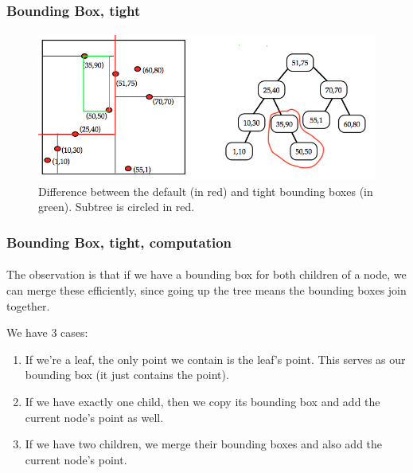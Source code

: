 \documentclass{beamer}                             %
\begin{document}
\begin{frame}
\frametitle{Bounding Box, tight}
\framesubtitle{}
\begin{figure}[h!]
  \centering
  \includegraphics[scale=0.38]{bounding_boxes.png}
  \caption{Difference between the default (in red)
and tight bounding boxes (in green). Subtree is circled in red.}
\end{figure}
\end{frame}

\begin{frame}
\frametitle{Bounding Box, tight, computation}
\framesubtitle{}
The observation is that if we have a bounding box for both
children of a node, we can merge these efficiently, since
going up the tree means the bounding boxes join together.

We have 3 cases:
\begin{enumerate}
  \item If we're a leaf, the only point we contain is the leaf's point.
    This serves as our bounding box (it just contains the point).
  \item If we have exactly one child, then we copy its bounding box and add
    the current node's point as well.
  \item If we have two children, we merge their bounding boxes and also add
    the current node's point. 
\end{enumerate}
\end{frame}
\end{document}
